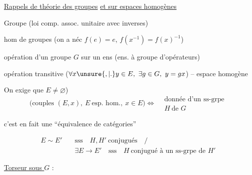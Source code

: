 \uline{Rappels de théorie des groupes} \uline{et sur espaces homogènes}

Groupe (loi comp. assoc. unitaire avec inverses)

hom de groupes (on a néc $f(e)=e$, $f(x^{-1})=f(x)^{-1}$)

opération d'un groupe $G$ sur un ens (ens. à groupe d'opérateurs)

opération transitive ($\forall x\unsure{,|\mathord{.}}y\in E,\ \exists g\in G,\ y=gx$) -- espace homogène

On exige  que $E\ne\varnothing$)
\[
\bigl(\text{couples }(E,x),\ E\ \text{esp. hom.},\ x\in E\bigr)
\Longleftrightarrow
\begin{aligned}&\text{donnée d'un ss-grpe}\\&H\ \text{de }G\end{aligned}
\]

c'est en fait une ``équivalence de catégories''

{\small
{}}
{\small
\[
\begin{aligned}
E\sim E' \quad &\text{sss}\quad H,H'\ \text{conjugués}\quad \big/\\[-2pt]
&\exists E\to E'\quad\text{sss}\quad H\ \text{conjugué à un ss-grpe de }H'
\end{aligned}
\]}

\uline{Torseur sous $G$} :
{\small
{}}

